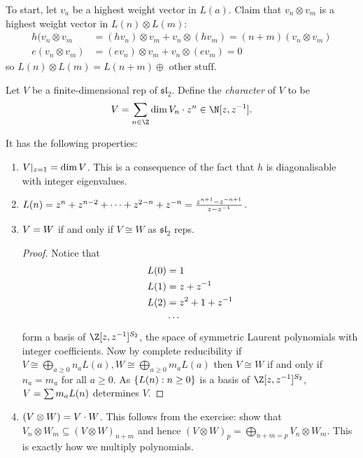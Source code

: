 \documentclass[a4paper]{article}
\newcommand*{\Lie}[1]{\mathfrak{#1}} %
\let\ch\relax
\DeclareMathOperator{\ch}{ch} %
\begin{document}
To start, let \(v_a\) be a highest weight vector in \(L(a)\). Claim that \(v_n \otimes v_m\) is a highest weight vector in \(L(n) \otimes L(m)\):
\begin{align*}
  h(v_n \otimes v_m &= (hv_n) \otimes v_m + v_n \otimes (hv_m) = (n + m) (v_n \otimes v_m) \\
  e(v_n \otimes v_m) &= (ev_n) \otimes v_m + v_n \otimes (ev_m) = 0
\end{align*}
so \(L(n) \otimes L(m) = L(n + m) \oplus \text{ other stuff}\).

\begin{definition}[character]
  Let \(V\) be a finite-dimensional rep of \(\Lie{sl}_2\). Define the \emph{character} of \(V\) to be
  \[
    \ch V = \sum_{n \in \Z} \dim V_n \cdot z^n \in \N[z, z^{-1}].
  \]
\end{definition}

It has the following properties:
\begin{enumerate}
\item \(\ch V|_{z = 1} = \dim V\). This is a consequence of the fact that \(h\) is diagonalisable with integer eigenvalues.
\item \(\ch L(n) = z^n + z^{n - 2} + \dots + z^{2 - n} + z^{-n} = \frac{z^{n + 1} - z^{-{n + 1}}}{z - z^{-1}}\).
\item \(\ch V = \ch W\) if and only if \(V \cong W\) as \(\Lie{sl}_2\) reps.
  \begin{proof}
    Notice that
    \begin{align*}
      \ch L(0) &= 1 \\
      \ch L(1) &= z + z^{-1} \\
      \ch L(2) &= z^2 + 1 + z^{-1} \\
               &\cdots
    \end{align*}
    form a basis of \(\Z[z, z^{-1}]^{S_2}\), the space of symmetric Laurent polynomials with integer coefficients. Now by complete reducibility if \(V \cong \bigoplus _{a\geq 0} n_a L(a), W \cong \bigoplus_{a \geq 0} m_a L(a)\) then \(V \cong W\) if and only if \(n_a = m_a\) for all \(a \geq 0\). As \(\{\ch L(n): n \geq 0\}\) is a basis of \(\Z[z, z^{-1}]^{S_2}\), \(\ch V = \sum m_a \ch L(n)\) determines \(V\).
  \end{proof}
\item \(\ch (V \otimes W) = \ch V \cdot \ch W\). This follows from the exercise: show that \(V_n \otimes W_m \subseteq (V \otimes W)_{n + m}\) and hence \((V \otimes W)_p = \bigoplus_{n + m = p} V_n \otimes W_m\). This is exactly how we multiply polynomials.
\end{enumerate}
\end{document}
